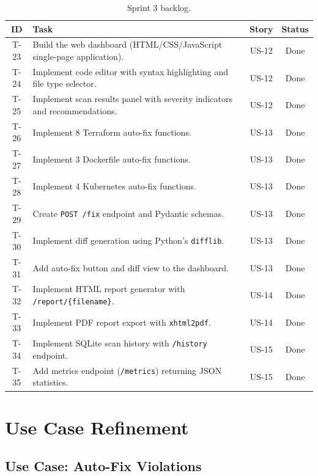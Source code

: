 \begin{table}[H]
\centering
\begin{tabularx}{\textwidth}{|c|X|c|c|}
\hline
\textbf{ID} & \textbf{Task} & \textbf{Story} & \textbf{Status} \\
\hline
T-23 & Build the web dashboard (HTML/CSS/JavaScript single-page application). & US-12 & Done \\
\hline
T-24 & Implement code editor with syntax highlighting and file type selector. & US-12 & Done \\
\hline
T-25 & Implement scan results panel with severity indicators and recommendations. & US-12 & Done \\
\hline
T-26 & Implement 8 Terraform auto-fix functions. & US-13 & Done \\
\hline
T-27 & Implement 3 Dockerfile auto-fix functions. & US-13 & Done \\
\hline
T-28 & Implement 4 Kubernetes auto-fix functions. & US-13 & Done \\
\hline
T-29 & Create \texttt{POST /fix} endpoint and Pydantic schemas. & US-13 & Done \\
\hline
T-30 & Implement diff generation using Python's \texttt{difflib}. & US-13 & Done \\
\hline
T-31 & Add auto-fix button and diff view to the dashboard. & US-13 & Done \\
\hline
T-32 & Implement HTML report generator with \texttt{/report/\{filename\}}. & US-14 & Done \\
\hline
T-33 & Implement PDF report export with \texttt{xhtml2pdf}. & US-14 & Done \\
\hline
T-34 & Implement SQLite scan history with \texttt{/history} endpoint. & US-15 & Done \\
\hline
T-35 & Add metrics endpoint (\texttt{/metrics}) returning JSON statistics. & US-15 & Done \\
\hline
\end{tabularx}
\caption{Sprint 3 backlog.}
\label{tab:s3-backlog}
\end{table}


\section{Use Case Refinement}

\subsection{Use Case: Auto-Fix Violations}

